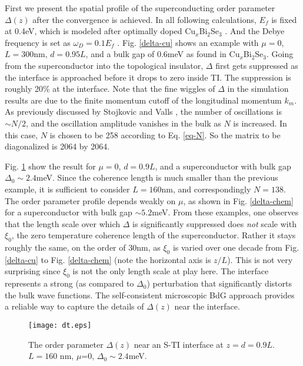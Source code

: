 \documentclass[11pt,revtex,aps]{report}
\begin{document}
First we present the spatial profile of the superconducting order parameter $\Delta(z)$
after the convergence is achieved. In all following calculations, $E_f$ is fixed at 0.4eV, 
which is modeled after optimally doped Cu$_x$Bi$_2$Se$_3$ \cite{cu2}. And the Debye frequency
is set as $\omega_D=0.1E_f$ \cite{h-v}.
%
Fig. \ref{delta-cu} shows an example with $\mu=0$, $L=300$nm, $d=0.95L$, and
a bulk gap of 0.6meV as found in Cu$_x$Bi$_2$Se$_3$. 
%
Going from the superconductor into the topological insulator,
$\Delta$ first gets suppressed as the interface is approached before it
drops to zero inside TI. The suppression is roughly 20\% at the interface.
Note that the fine wiggles of $\Delta$ in the simulation results 
are due to the finite momentum cutoff of 
the longitudinal momentum $k_m$. As previously discussed by 
Stojkovic and Valls \cite{s-v}, the number of oscillations is $\sim N/2$, and the 
oscillation amplitude vanishes in the bulk as $N$ is increased. 
In this case, $N$ is chosen to be
258 according to Eq. \eqref{eq-N}. So the matrix to be diagonalized is 2064 by 2064.

Fig. \ref{delta-24} show the result for $\mu=0$, $d=0.9L$, and 
a superconductor with bulk gap $\Delta_0\sim 2.4$meV. Since the coherence length
is much smaller than the previous example, it is sufficient to consider 
$L=160$nm, and correspondingly $N=138$. 
The order parameter profile  
depends weakly on $\mu$, as shown in Fig. \ref{delta-chem} for a superconductor
with bulk gap $\sim 5.2$meV. 
From these examples, one observes that the length scale over which $\Delta$ is 
significantly suppressed does {\it not} scale with $\xi_0$, the zero temperature
coherence length of the superconductor. Rather it stays roughly the same, 
on the order of $30$nm, as $\xi_0$ is varied over one decade from Fig. \ref{delta-cu}
to Fig. \ref{delta-chem} (note the horizontal axis is $z/L$). 
This is not very surprising since $\xi_0$ is not the only length scale at play here.
The interface represents a strong (as compared to $\Delta_0$) perturbation that 
significantly distorts the bulk wave functions.
The self-consistent microscopic BdG approach provides a reliable way to
capture the details of $\Delta(z)$ near the interface.


\begin{figure}
\center
\texttt{[image: dt.eps]}
\caption{The order parameter $\Delta(z)$ near an S-TI interface at $
z=d=0.9L$. $L=160$ nm, $\mu$=0, $\Delta_0\sim 2.4$meV.}
\label{delta-24}
\end{figure}
\end{document}
